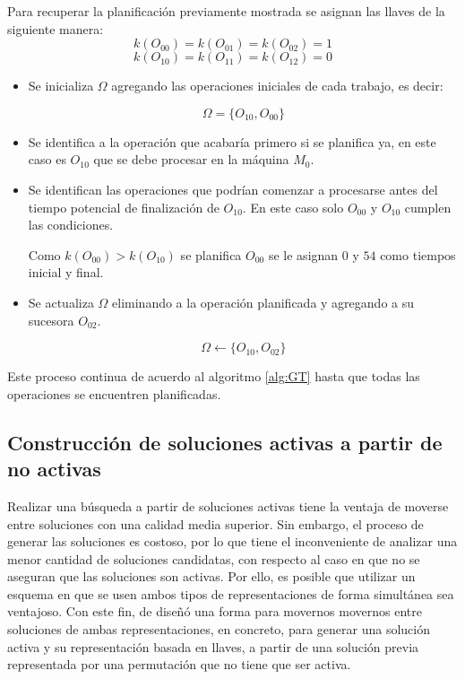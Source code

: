Para recuperar la planificación previamente mostrada se asignan las llaves de la siguiente manera: \[k(O_{00})=k(O_{01})=k(O_{02})=1\]  \[k(O_{10})=k(O_{11})=k(O_{12})=0\]
\begin{itemize}
    \item Se inicializa $\Omega$ agregando las operaciones iniciales de cada trabajo, es decir:

\[\Omega = \{O_{10},O_{00}\}\]

     \item Se identifica a la operación que acabaría primero si se planifica ya, en este caso es $O_{10}$ que se debe procesar en la máquina $M_0$. 

     \item Se identifican las operaciones que podrían comenzar a procesarse antes del tiempo potencial de finalización de $O_{10}$. 
		 En este caso solo $O_{00}$ y  $O_{10}$ cumplen las condiciones.

Como $k(O_{00})>k(O_{10})$ se planifica $O_{00}$ se le asignan $0$ y $54$ como tiempos inicial y final.

     \item Se actualiza $\Omega$ eliminando a la operación planificada y agregando a su sucesora $O_{02}$.

\[\Omega\leftarrow \{O_{10},O_{02}\}\]
\end{itemize}
Este proceso continua de acuerdo al algoritmo \ref{alg:GT} hasta que todas las operaciones se encuentren planificadas.

\subsection{Construcción de soluciones activas a partir de no activas}

Realizar una búsqueda a partir de soluciones activas tiene la ventaja de moverse entre soluciones con una calidad media
superior.
%
Sin embargo, el proceso de generar las soluciones es costoso, por lo que tiene el inconveniente de analizar una menor
cantidad de soluciones candidatas, con respecto al caso en que no se aseguran que las soluciones son activas.
%
Por ello, es posible que utilizar un esquema en que se usen ambos tipos de representaciones de forma simultánea sea
ventajoso.
%
Con este fin, de diseñó una forma para movernos movernos entre soluciones de ambas representaciones, en concreto, para
generar una solución activa y su representación basada en llaves, a partir de una solución previa representada por una permutación que no tiene que ser activa. 


